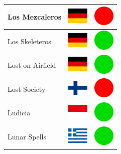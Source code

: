 \documentclass[12pt, a4paper, twoside]{report}
\begin{document}
\begin{center}
\begin{longtable}{|p{5cm}|p{2cm}|p{2cm}|}
 Los Mezcaleros                                             & \includegraphics[width=1cm]{../img/flags/de} &   \includegraphics[width=1cm]{../likes/n} \\ \hline
 Los Skeleteros                                             & \includegraphics[width=1cm]{../img/flags/de} &   \includegraphics[width=1cm]{../likes/y} \\ \hline
 Lost on Airfield                                           & \includegraphics[width=1cm]{../img/flags/de} &   \includegraphics[width=1cm]{../likes/y} \\ \hline
 Lost Society                                               & \includegraphics[width=1cm]{../img/flags/fi} &   \includegraphics[width=1cm]{../likes/n} \\ \hline
 Ludicia                                                    & \includegraphics[width=1cm]{../img/flags/id} &   \includegraphics[width=1cm]{../likes/y} \\ \hline
 Lunar Spells                                               & \includegraphics[width=1cm]{../img/flags/gr} &   \includegraphics[width=1cm]{../likes/y} \\ \hline

\end{longtable}
\end{center}
\end{document}
